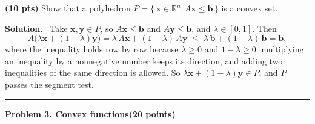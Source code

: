 \documentclass[10pt]{article}
\newcommand{\problem}[2]{%
  \par\bigskip
  {\color{ruleink}\rule{\textwidth}{1pt}}\par\nobreak\vspace{3pt}
  {\large\bfseries #2}\hfill{\normalsize\bfseries(#1 points)}\par\nobreak\vspace{4pt}}
\newenvironment{solution}
  {\par\smallskip\begingroup\color{solink}\textbf{Solution.}\ }
  {\endgroup\par}
\begin{document}
\begin{parts}
\item \textbf{(10 pts)} Show that a polyhedron $P = \{\, \bm{x} \in \mathbb{R}^n : A\bm{x} \le \bm{b} \,\}$
  is a convex set.

\begin{solution}
Take $\bm{x}, \bm{y} \in P$, so $A\bm{x} \le \bm{b}$ and $A\bm{y} \le \bm{b}$, and $\lambda \in [0,1]$. Then
\[
  A\big(\lambda \bm{x} + (1-\lambda) \bm{y}\big)
  = \lambda\, A\bm{x} + (1-\lambda)\, A\bm{y}
  \;\le\; \lambda\, \bm{b} + (1-\lambda)\, \bm{b}
  = \bm{b} ,
\]
where the inequality holds row by row because $\lambda \ge 0$ and $1 - \lambda \ge 0$:
multiplying an inequality by a nonnegative number keeps its direction, and adding two
inequalities of the same direction is allowed. So $\lambda \bm{x} + (1-\lambda) \bm{y} \in P$, and
$P$ passes the segment test.
\end{solution}
\end{parts}

\problem{20}{Problem 3. Convex functions}
\end{document}
